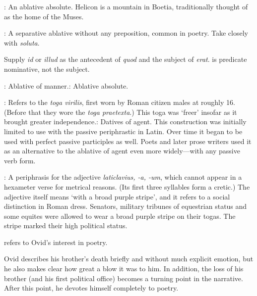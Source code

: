 
: An ablative absolute. Helicon is a mountain in
Boetia, traditionally thought of as the home of the Muses.


: A separative ablative without any preposition, common in poetry.
Take closely with \textit{soluta}.


Supply \textit{id} or \textit{illud} as the antecedent of \textit{quod} and the
subject of \textit{erat}.\indent{} is predicate nominative, not the
subject.


: Ablative of manner.\indent{}: Ablative
absolute.


: Refers to the \textit{toga virilis}, first worn by
Roman citizen males at roughly 16.  (Before that they wore the \textit{toga
praetexta}.)  This toga was `freer' insofar as it brought greater
independence.\indent{}: Datives of agent.  This construction
was initially limited to use with the passive periphrastic in Latin.  Over time
it began to be used with perfect passive participles as well.  Poets and later
prose writers used it as an alternative to the ablative of agent even more
widely---with any passive verb form.


: A periphrasis for the adjective
\textit{laticlavius, -a, -um}, which cannot appear in a hexameter verse for
metrical reasons.  (Its first three syllables form a cretic.)  The adjective
itself means `with a broad purple stripe', and it refers to a social
distinction in Roman dress.  Senators, military tribunes of equestrian status
and some equites were allowed to wear a broad purple stripe on their togas.
The stripe marked their high political status.


 refers to Ovid's interest in poetry.


Ovid describes his brother's death briefly and without much explicit emotion,
but he also makes clear how great a blow it was to him.  In addition, the loss
of his brother (and his first political office) becomes a turning point in the
narrative.  After this point, he devotes himself completely to poetry.

